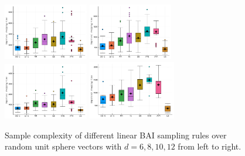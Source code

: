 \begin{figure}[ht]
 \centering
 \includegraphics[clip, width= 0.33\textwidth]{Chapter4/img/bai_dim_6}
 \includegraphics[clip, width= 0.33\textwidth]{Chapter4/img/bai_dim_8}
 \includegraphics[clip, width= 0.33\textwidth]{Chapter4/img/bai_dim_10}
 \includegraphics[clip, width= 0.34\textwidth]{Chapter4/img/bai_dim_12}
 \caption{Sample complexity of different linear BAI sampling rules over random unit sphere vectors with $d=6, 8, 10, 12$ from left to right.}
 \label{fig:sample_complexity_2}
\end{figure}


